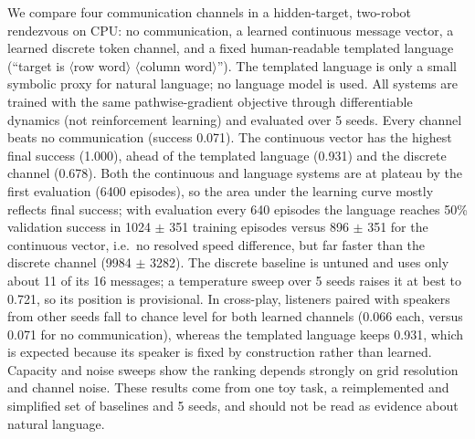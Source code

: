 We compare four communication channels in a hidden-target, two-robot rendezvous on CPU: no communication, a learned continuous message vector, a learned discrete token channel, and a fixed human-readable templated language (``target is $\langle$row word$\rangle$ $\langle$column word$\rangle$''). The templated language is only a small symbolic proxy for natural language; no language model is used. All systems are trained with the same pathwise-gradient objective through differentiable dynamics (not reinforcement learning) and evaluated over 5 seeds. Every channel beats no communication (success 0.071). The continuous vector has the highest final success (1.000), ahead of the templated language (0.931) and the discrete channel (0.678). Both the continuous and language systems are at plateau by the first evaluation (6400 episodes), so the area under the learning curve mostly reflects final success; with evaluation every 640 episodes the language reaches 50\% validation success in 1024 $\pm$ 351 training episodes versus 896 $\pm$ 351 for the continuous vector, i.e.\ no resolved speed difference, but far faster than the discrete channel (9984 $\pm$ 3282). The discrete baseline is untuned and uses only about 11 of its 16 messages; a temperature sweep over 5 seeds raises it at best to 0.721, so its position is provisional. In cross-play, listeners paired with speakers from other seeds fall to chance level for both learned channels (0.066 each, versus 0.071 for no communication), whereas the templated language keeps 0.931, which is expected because its speaker is fixed by construction rather than learned. Capacity and noise sweeps show the ranking depends strongly on grid resolution and channel noise. These results come from one toy task, a reimplemented and simplified set of baselines and 5 seeds, and should not be read as evidence about natural language.
